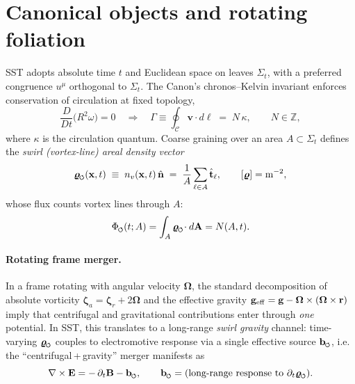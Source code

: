\documentclass[11pt,a4paper]{article}
\newcommand{\swirlarrow}{%
    \mathchoice{\mkern-2mu\scriptstyle\boldsymbol{\circlearrowleft}}%
    {\mkern-2mu\scriptstyle\boldsymbol{\circlearrowleft}}%
    {\mkern-2mu\scriptscriptstyle\boldsymbol{\circlearrowleft}}%
    {\mkern-2mu\scriptscriptstyle\boldsymbol{\circlearrowleft}}%
}
\begin{document}
\section{Canonical objects and rotating foliation}
    SST adopts absolute time $t$ and Euclidean space on leaves $\Sigma_t$, with a preferred congruence $u^\mu$ orthogonal to $\Sigma_t$. The Canon’s chronos--Kelvin invariant enforces conservation of circulation at fixed topology,
    \begin{equation}
    \frac{D}{Dt}\Big(R^2\omega\Big)=0
    \quad\Longrightarrow\quad
    \Gamma\equiv\oint_{\mathcal C}\mathbf v\!\cdot d\boldsymbol\ell \;=\; N\,\kappa,\qquad N\in\mathbb Z,
    \label{eq:Kelvin}
    \end{equation}
    where $\kappa$ is the circulation quantum. Coarse graining over an area $A\subset\Sigma_t$ defines the \emph{swirl (vortex-line) areal density vector}
    \begin{equation}
    \bm{\varrho}_{\rm \swirlarrow}(\mathbf x,t) \;\equiv\; n_v(\mathbf x,t)\,\hat{\mathbf n} \;=\; \frac{1}{A}\sum_{\ell\in A}\hat{\mathbf t}_\ell,
    \qquad [\bm{\varrho}]={\rm m^{-2}},
    \label{eq:rho_def}
    \end{equation}
    whose flux counts vortex lines through $A$:
    \begin{equation}
    \Phi_{\rm \swirlarrow}(t;A)=\int_A \bm{\varrho}_{\rm \swirlarrow}\!\cdot d\mathbf A = N(A,t).
    \label{eq:swflux}
    \end{equation}

    \paragraph{Rotating frame merger.}
        In a frame rotating with angular velocity $\boldsymbol\Omega$, the standard decomposition of absolute vorticity $\boldsymbol\zeta_a=\boldsymbol\zeta_r+2\boldsymbol\Omega$ and the effective gravity $\mathbf g_{\rm eff}=\mathbf g-\boldsymbol\Omega\times(\boldsymbol\Omega\times\mathbf r)$ imply that centrifugal and gravitational contributions enter through \emph{one} potential. In SST, this translates to a long-range \emph{swirl gravity} channel: time-varying $\bm{\varrho}_{\rm \swirlarrow}$ couples to electromotive response via a single effective source $\mathbf b_{\rm \swirlarrow}$, i.e. the ``centrifugal\,+\,gravity'' merger manifests as
        \begin{equation}
        \nabla\times\mathbf E = -\,\partial_t\mathbf B - \mathbf b_{\rm \swirlarrow},
        \qquad \mathbf b_{\rm \swirlarrow}=\text{(long-range response to }\partial_t \bm{\varrho}_{\rm \swirlarrow}\text{)}.
        \label{eq:Faraday_mod}
        \end{equation}
\end{document}
